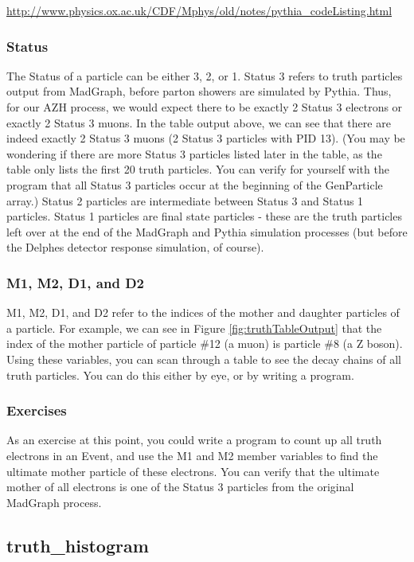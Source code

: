 \documentclass{article}
\begin{document}
\url{http://www.physics.ox.ac.uk/CDF/Mphys/old/notes/pythia_codeListing.html}

\subsubsection{Status}

The Status of a particle can be either 3, 2, or 1. Status 3 refers to truth particles output
from MadGraph, before parton showers are simulated by Pythia. Thus, for our AZH process, we
would expect there to be exactly 2 Status 3 electrons or exactly 2 Status 3 muons. In the table
output above, we can see that there are indeed exactly 2 Status 3 muons (2 Status 3 particles
with PID 13). (You may be wondering if there are more Status 3 particles listed later in the
table, as the table only lists the first 20 truth particles. You can verify for yourself with
the program that all Status 3 particles occur at the beginning of the GenParticle array.) Status
2 particles are intermediate between Status 3 and Status 1 particles. Status 1 particles are final
state particles - these are the truth particles left over at the end of the MadGraph and Pythia
simulation processes (but before the Delphes detector response simulation, of course).

\subsubsection{M1, M2, D1, and D2}

M1, M2, D1, and D2 refer to the indices of the mother and daughter particles of a particle.
For example, we can see in Figure \ref{fig:truthTableOutput} that the index of the mother particle
of particle \#12 (a muon) is particle \#8 (a Z boson). Using these variables, you can scan through
a table to see the decay chains of all truth particles. You can do this either by eye, or by writing a program.

\subsubsection*{Exercises}

As an exercise at this point, you could write a program to count up all truth electrons in an Event,
and use the M1 and M2 member variables to find the ultimate mother particle of these electrons. You can
verify that the ultimate mother of all electrons is one of the Status 3 particles from the original MadGraph process.

\subsection{truth\_histogram}
\end{document}
